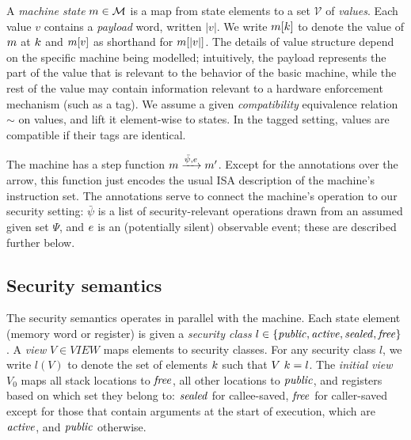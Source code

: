 \documentclass[10pt,conference]{ieeetran}%
\theoremstyle{definition}
\begin{document}
A {\em machine state} \(m \in {\mathcal M}\) is a map from state elements to a set \(\mathcal{V}\) of
\emph{values}.
Each value \(v\) contains a \emph{payload} word, written \(|v|\).
We write \(m[k]\) to denote the value of \(m\) at
\(k\)  and \(m[v]\) as shorthand for \(m[|v|]\).
The details of value structure depend on the specific machine being modelled;
intuitively, the payload represents the part of the value that is relevant to
the behavior of the basic machine, while the rest of the value may contain
information relevant to a hardware enforcement mechanism (such as a tag).
We assume a given \emph{compatibility} equivalence relation \(\sim\) on values,
and lift it element-wise to states.
In the tagged setting, values are compatible if their tags are identical.

The machine has a step function \(m \xrightarrow{\bar{\psi},e} m'\).
Except for the annotations over the arrow, this function just encodes the usual
ISA description of the machine's instruction set. The annotations serve to connect
the machine's operation to our security setting: 
\(\bar{\psi}\) is a list of security-relevant operations drawn from an assumed given set \(\Psi\),
and \(e\) is an (potentially silent) observable event; these are described further below.

\subsection{Security semantics}

The security semantics operates in parallel with the machine.
Each state element (memory word or register) is given a \emph{security class} 
\(l \in \{\mathit{public}, \mathit{active}, \mathit{sealed}, \mathit{free}\}\).
A \emph{view} \(V \in \mathit{VIEW}\) maps elements to security classes.
For any security class \(l\), we write \(l(V)\)
to denote the set of elements \(k\) such that \(V ~ k = l\).
The {\it initial view} \(V_0\) maps all stack locations to \(\mathit{free}\),
all other locations to \(\mathit{public}\), and registers based on which set they
belong to: \(\mathit{sealed}\) for callee-saved, \(\mathit{free}\) for caller-saved except for those
that contain arguments at the start of execution, which are \(\mathit{active}\), and \(\mathit{public}\) otherwise.
\end{document}
